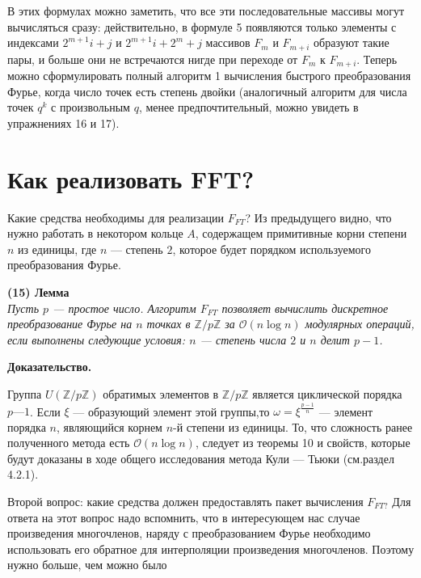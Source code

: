 \documentclass{mai_book}
\begin{document}
В этих формулах можно заметить, что все эти последовательные массивы могут вычисляться сразу: действительно, в формуле 5 появляются только элементы с индексами $2^{m+1}i+j$ и $2^{m+1}i + 2^m +j$ массивов $F_m$ и $F_{m+i}$ образуют такие пары, и больше они не встречаются нигде
при переходе от $F_m$ к $F_{m+i}$. Теперь можно сформулировать полный алгоритм 1 вычисления быстрого преобразования Фурье, когда число точек есть степень двойки (аналогичный алгоритм для числа точек $q^k$ с произвольным $q$, менее предпочтительный, можно увидеть в
упражнениях 16 и 17).

\section{Как реализовать FFT?}
Какие средства необходимы для реализации $F_{FT}$? Из предыдущего видно, что нужно работать в некотором кольце $A$, содержащем примитивные корни степени $n$ из единицы, где $n$ — степень $2$, которое будет порядком используемого преобразования Фурье.

\textbf{(15) Лемма}\smallskip\\
\textit{Пусть $p$ — простое число. Алгоритм $F_{FT}$ позволяет вычислить дискретное преобразование Фурье на $n$ точках в $\mathbb{Z}/p\mathbb{Z}$
за $\mathcal{O} (n \log n)$ модулярных операций, если выполнены следующие условия: $n$ — степень
числа $2$ и $n$ делит $p-1$.
}

\textbf{Доказательство.}

Группа $U(\mathbb{Z}/p\mathbb{Z})$
обратимых элементов в $\mathbb{Z}/p\mathbb{Z}$ является
циклической порядка $p — 1$. Если $\xi$ — образующий элемент этой группы,то $\omega=\xi^{\frac{p-1}{n}}$ — элемент порядка $n$, являющийся корнем $n$-й степени из единицы. То, что сложность ранее полученного метода есть
$\mathcal{O}( n \log n)$, следует из теоремы 10 и свойств, которые будут
доказаны в ходе общего исследования метода Кули — Тьюки (см.раздел 4.2.1).

Второй вопрос: какие средства должен предоставлять пакет вычисления $F_{FT?}$ Для ответа на этот вопрос надо вспомнить, что в интересующем нас случае произведения многочленов, наряду с преобразованием Фурье необходимо использовать его обратное для интерполяции произведения многочленов. Поэтому нужно больше, чем можно было
\end{document}
